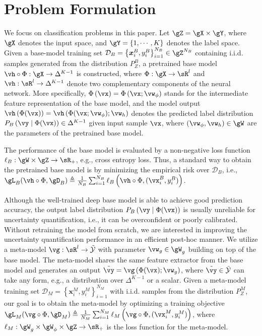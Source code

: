 \section{Problem Formulation} \label{sec:problem}
We focus on classification problems in this paper. Let $\gZ = \gX \times \gY$, where $\gX$ denotes the input space, and $\gY=\{1,\cdots,K\}$ denotes the label space. Given a base-model training set $\mathcal{D}_B=\left\{\boldsymbol{x}^B_{i}, y^B_{i}\right\}_{i=1}^{N_B}\in \gZ^{N_B} $ containing i.i.d. samples generated from the distribution $P^{B}_{Z}$, a pretrained base model $\vh \circ \Phi:\gX \rightarrow \Delta^{K-1}$ is constructed, where $\Phi: \gX \rightarrow \sR^{l}$ and $\vh: \sR^{l} \rightarrow \Delta^{K-1}$ denote two complementary components of the neural network. More specifically,  $\Phi\left(\vx\right) = \Phi\left(\vx; \vw_{\phi}\right)$ stands for the intermediate feature representation of the base model, and the model output $\vh\left(\Phi(\vx)\right) = \vh\left(\Phi(\vx; \vw_{\phi}); \vw_h\right)$ denotes the  predicted label distribution $P_B\left( \vy \mid \Phi(\vx)\right) \in \Delta^{K-1}$ given input sample $\vx$, where $\left(\vw_{\phi}, \vw_h\right)\in \gW$ are the parameters of the pretrained base model.

The performance of the base model is evaluated by a non-negative loss function $\ell_B: \gW \times \gZ \to \sR_+$, e.g., cross entropy loss. Thus, a standard way to obtain the pretrained base model is by minimizing the empirical risk over $\mathcal{D}_B$, i.e., $\gL_B(\vh \circ \Phi,\gD_B) \triangleq \frac{1}{N_B}\sum_{i=1}^{N_B} \ell_B \left(\vh \circ \Phi, (\vx^B_i,y^B_i) \right)$.   


Although the well-trained deep base model is able to achieve good prediction accuracy, the output label distribution $P_B\left(\vy \mid \Phi(\vx)\right)$ is usually  unreliable for uncertainty quantification, i.e., it can be overconfident or poorly calibrated. Without retraining the model from scratch, we are interested in improving the uncertainty quantification performance in an efficient post-hoc manner. We utilize a meta-model $\vg : \sR^{l} \rightarrow \mathcal{\tilde{Y}}$ with parameter $\vw_{g}\in \gW_g$ building on top of the base model. The meta-model shares the same feature extractor from the base model and generates an output $\tilde{\vy} = \vg\left(\Phi(\vx); \vw_g\right)$, where $\tilde{\vy}\in \mathcal{\tilde{Y}}$ can take any form, e.g., a distribution over $\Delta^{K-1}$ or a scalar. Given a meta-model training set $\mathcal{D}_M=\left\{\boldsymbol{x}^M_{i}, y^M_{i}\right\}_{i=1}^{N_M}$ with i.i.d. samples from the distribution $P^{M}_{Z}$, our goal is to obtain the meta-model by optimizing a training objective $\gL_M(\vg \circ \Phi,\gD_M) \triangleq \frac{1}{N_M}\sum_{i=1}^{N_M} \ell_M \left(\vg \circ \Phi, (\vx^M_i,y^M_i) \right)$, where $\ell_M: \gW_g \times \gW_{\phi} \times \gZ \to \sR_+$ is the loss function for the meta-model. 

